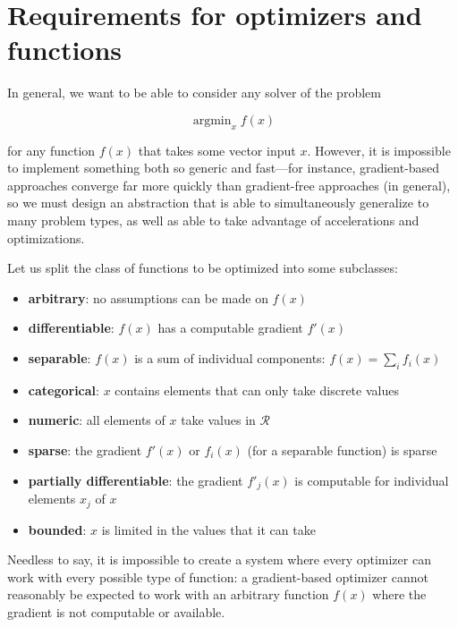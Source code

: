\documentclass{article}
\begin{document}
\section{Requirements for optimizers and functions}

In general, we want to be able to consider any solver of the problem

\begin{equation}
\operatorname{argmin}_{x} f(x)
\end{equation}

\noindent for any function $f(x)$ that takes some vector input $x$.  However, it
is impossible to implement something both so generic and fast---for instance,
gradient-based approaches converge far more quickly than gradient-free
approaches (in general), so we must design an abstraction that is able to
simultaneously generalize to many problem types, as well as able to take
advantage of accelerations and optimizations.

Let us split the class of functions to be optimized into some subclasses:

\begin{itemize}
  \item {\bf arbitrary}: no assumptions can be made on $f(x)$
  \item {\bf differentiable}: $f(x)$ has a computable gradient $f'(x)$
  \item {\bf separable}: $f(x)$ is a sum of individual components: $f(x) =
\sum_{i} f_i(x)$
  \item {\bf categorical}: $x$ contains elements that can only take discrete
values
  \item {\bf numeric}: all elements of $x$ take values in $\mathcal{R}$
  \item {\bf sparse}: the gradient $f'(x)$ or $f_i(x)$ (for a separable
function) is sparse
  \item {\bf partially differentiable}: the gradient $f'_j(x)$ is computable for
individual elements $x_j$ of $x$
  \item {\bf bounded}: $x$ is limited in the values that it can take
\end{itemize}

Needless to say, it is impossible to create a system where every optimizer can
work with every possible type of function: a gradient-based optimizer cannot
reasonably be expected to work with an arbitrary function $f(x)$ where the
gradient is not computable or available.
\end{document}

